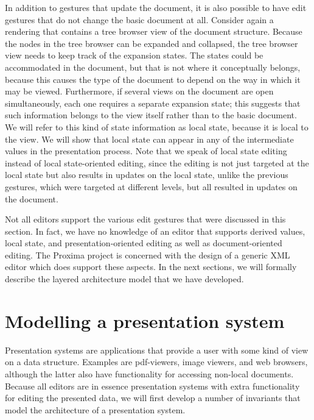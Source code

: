 \documentclass[twoside,epsf]{report}
\begin{document}
 In addition to gestures that update the document, it is also possible to have edit gestures that do not change the basic document at all. Consider again a rendering that contains a tree browser view of the document structure. Because the nodes in the tree browser can be expanded and collapsed, the tree browser view needs to keep track of the expansion states. The states could be accommodated in the document, but that is not where it conceptually belongs, because this causes the type of the document to depend on the way in which it may be viewed. Furthermore, if several views on the document are open simultaneously, each one requires a separate expansion state; this suggests that such information belongs to the view itself rather than to the basic document. We will refer to this kind of state information as local state, because it is local to the view. We will show that local state can appear in any of the intermediate values in the presentation process. Note that we speak of local state editing instead of local state-oriented editing, since the editing is not just targeted at the local state but also results in updates on the local state, unlike the previous gestures, which were targeted at different levels, but all resulted in updates on the document.

Not all editors support the various edit gestures that were discussed in this section. In fact, we have no knowledge of an editor that supports derived values, local state, and presentation-oriented editing as well as document-oriented editing.  The Proxima project is concerned with the design of a generic XML editor which does support these aspects. In the next sections, we will formally describe the layered architecture model that we have developed.
\section{Modelling a presentation system}
\label{presenting}



Presentation systems are applications that provide a user with some kind of view on a data structure. Examples are pdf-viewers, image viewers, and web browsers, although the latter also have functionality for accessing non-local documents. Because all editors are in essence presentation systems with extra functionality for editing the presented data, we will first develop a number of invariants that model the architecture of a presentation system.
\end{document}
